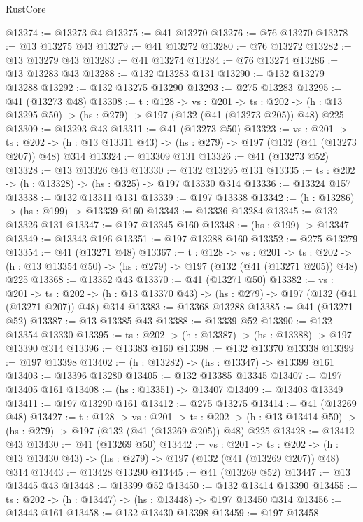 \begin{lexlean}{RustCore}
\begin{coremodule}
@13274 := @13273 @4
@13275 := @41 @13270
@13276 := @76 @13270
@13278 := @13 @13275 @43
@13279 := @41 @13272
@13280 := @76 @13272
@13282 := @13 @13279 @43
@13283 := @41 @13274
@13284 := @76 @13274
@13286 := @13 @13283 @43
@13288 := @132 @13283 @131
@13290 := @132 @13279 @13288
@13292 := @132 @13275 @13290
@13293 := @275 @13283
@13295 := @41 (@13273 @48)
@13308 := {t : @128} ->
  {vs : @201} ->
  {ts : @202} -> (h : @13 @13295 @50) -> (hs : @279) -> @197 (@132 (@41 (@13273 @205)) @48) @225
@13309 := @13293 @43
@13311 := @41 (@13273 @50)
@13323 := {vs : @201} ->
  {ts : @202} -> (h : @13 @13311 @43) -> (hs : @279) -> @197 (@132 (@41 (@13273 @207)) @48) @314
@13324 := @13309 @131
@13326 := @41 (@13273 @52)
@13328 := @13 @13326 @43
@13330 := @132 @13295 @131
@13335 := {ts : @202} -> (h : @13328) -> (hs : @325) -> @197 @13330 @314
@13336 := @13324 @157
@13338 := @132 @13311 @131
@13339 := @197 @13338
@13342 := (h : @13286) -> (hs : @199) -> @13339 @160
@13343 := @13336 @13284
@13345 := @132 @13326 @131
@13347 := @197 @13345 @160
@13348 := (hs : @199) -> @13347
@13349 := @13343 @196
@13351 := @197 @13288 @160
@13352 := @275 @13279
@13354 := @41 (@13271 @48)
@13367 := {t : @128} ->
  {vs : @201} ->
  {ts : @202} -> (h : @13 @13354 @50) -> (hs : @279) -> @197 (@132 (@41 (@13271 @205)) @48) @225
@13368 := @13352 @43
@13370 := @41 (@13271 @50)
@13382 := {vs : @201} ->
  {ts : @202} -> (h : @13 @13370 @43) -> (hs : @279) -> @197 (@132 (@41 (@13271 @207)) @48) @314
@13383 := @13368 @13288
@13385 := @41 (@13271 @52)
@13387 := @13 @13385 @43
@13388 := @13339 @52
@13390 := @132 @13354 @13330
@13395 := {ts : @202} -> (h : @13387) -> (hs : @13388) -> @197 @13390 @314
@13396 := @13383 @160
@13398 := @132 @13370 @13338
@13399 := @197 @13398
@13402 := (h : @13282) -> (hs : @13347) -> @13399 @161
@13403 := @13396 @13280
@13405 := @132 @13385 @13345
@13407 := @197 @13405 @161
@13408 := (hs : @13351) -> @13407
@13409 := @13403 @13349
@13411 := @197 @13290 @161
@13412 := @275 @13275
@13414 := @41 (@13269 @48)
@13427 := {t : @128} ->
  {vs : @201} ->
  {ts : @202} -> (h : @13 @13414 @50) -> (hs : @279) -> @197 (@132 (@41 (@13269 @205)) @48) @225
@13428 := @13412 @43
@13430 := @41 (@13269 @50)
@13442 := {vs : @201} ->
  {ts : @202} -> (h : @13 @13430 @43) -> (hs : @279) -> @197 (@132 (@41 (@13269 @207)) @48) @314
@13443 := @13428 @13290
@13445 := @41 (@13269 @52)
@13447 := @13 @13445 @43
@13448 := @13399 @52
@13450 := @132 @13414 @13390
@13455 := {ts : @202} -> (h : @13447) -> (hs : @13448) -> @197 @13450 @314
@13456 := @13443 @161
@13458 := @132 @13430 @13398
@13459 := @197 @13458

\end{coremodule}
\end{lexlean}
